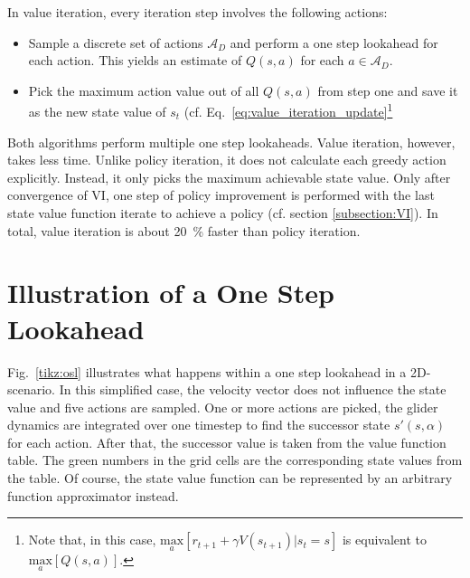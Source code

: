 In value iteration, every iteration step involves the following actions:

\begin{itemize}
	\item Sample a discrete set of actions $\mathcal{A}_D$ and perform a one step lookahead for each action. This yields an estimate of $Q(s,a)$ for each $a\in \mathcal{A}_D$.
	\item Pick the maximum action value out of all $Q(s,a)$ from step one and save it as the new state value of $s_t$ (cf. Eq.~\ref{eq:value_iteration_update}\footnote{Note that, in this case, $\underset{a}{\text{max}}[r_{t+1}+\gamma V(s_{t+1})|s_t=s]$ is equivalent to $\underset{a}{\text{max}}[Q(s,a)]$.}
\end{itemize}

Both algorithms perform multiple one step lookaheads. Value iteration, however, takes less time. Unlike policy iteration, it does not calculate each greedy action explicitly. Instead, it only picks the maximum achievable state value. Only after convergence of VI, one step of policy improvement is performed with the last state value function iterate to achieve a policy (cf. section \ref{subsection:VI}). In total, value iteration is about 20~\% faster than policy iteration. \newpage

\section{Illustration of a One Step Lookahead}

Fig.~\ref{tikz:osl} illustrates what happens within a one step lookahead in a 2D-scenario. In this simplified case, the velocity vector does not influence the state value and five actions are sampled. One or more actions are picked, the glider dynamics are integrated over one timestep to find the successor state $s'(s,\alpha)$ for each action. After that, the successor value is taken from the value function table. The green numbers in the grid cells are the corresponding state values from the table. Of course, the state value function can be represented by an arbitrary function approximator instead. 

